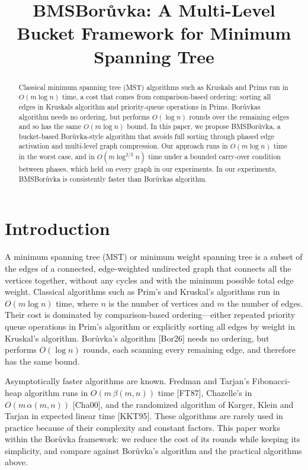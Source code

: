 \documentclass[11pt]{article}
\title{BMSBorůvka: A Multi-Level Bucket Framework for Minimum Spanning Tree}
\author{}
\date{}
\theoremstyle{plain}
\theoremstyle{remark}
\begin{document}
\maketitle







\begin{abstract}
Classical minimum spanning tree (MST) algorithms such as
Kruskal\textquotesingle s and Prim\textquotesingle s run in
\(O(m \log n)\) time, a cost that comes from comparison-based ordering:
sorting all edges in Kruskal\textquotesingle s algorithm and
priority-queue operations in Prim\textquotesingle s.
Borůvka\textquotesingle s algorithm needs no ordering, but performs
\(O(\log n)\) rounds over the remaining edges and so has the same
\(O(m \log n)\) bound. In this paper, we propose BMSBorůvka, a
bucket-based Borůvka-style algorithm that avoids full sorting through
phased edge activation and multi-level graph compression. Our approach
runs in \(O(m \log n)\) time in the worst case, and in
\(O(m \log^{2/3} n)\) time under a bounded carry-over condition between
phases, which held on every graph in our experiments. In our
experiments, BMSBorůvka is consistently faster than
Borůvka\textquotesingle s algorithm.
\end{abstract}

\section{Introduction}

A minimum spanning tree (MST) or minimum weight spanning tree is a
subset of the edges of a connected, edge-weighted undirected graph that
connects all the vertices together, without any cycles and with the
minimum possible total edge weight. Classical algorithms such as Prim's
and Kruskal's algorithms run in \(O(m \log n)\) time, where \(n\) is the
number of vertices and \(m\) the number of edges. Their cost is dominated
by comparison-based ordering---either repeated priority queue operations
in Prim's algorithm or explicitly sorting all edges by weight in
Kruskal's algorithm. Borůvka's algorithm {[}Bor26{]} needs no ordering,
but performs \(O(\log n)\) rounds, each scanning every remaining edge,
and therefore has the same bound.

Asymptotically faster algorithms are known. Fredman and Tarjan's
Fibonacci-heap algorithm runs in \(O(m\,\beta(m,n))\) time {[}FT87{]},
Chazelle's in \(O(m\,\alpha(m,n))\) {[}Cha00{]}, and the randomized
algorithm of Karger, Klein and Tarjan in expected linear time
{[}KKT95{]}. These algorithms are rarely used in practice because of
their complexity and constant factors. This paper works within the
Borůvka framework: we reduce the cost of its rounds while keeping its
simplicity, and compare against Borůvka's algorithm and the practical
algorithms above.
\end{document}
